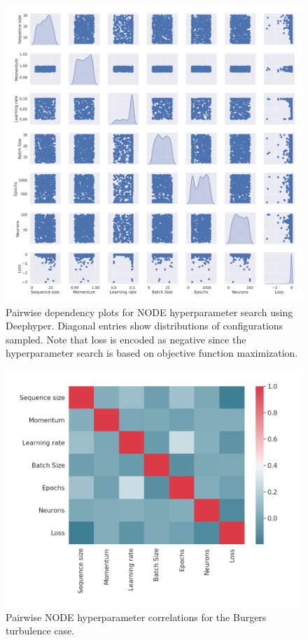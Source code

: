 \documentclass[preprint,12pt]{elsarticle}
\begin{document}
\begin{figure}
	\centering
	\includegraphics[width=\textwidth]{Figure_20.pdf}
	\caption{Pairwise dependency plots for NODE hyperparameter search using Deephyper. Diagonal entries show distributions of configurations sampled. Note that loss is encoded as negative since the hyperparameter search is based on objective function maximization.}
	\label{Figure15}
\end{figure}

\begin{figure}
	\centering
	\includegraphics[width=\textwidth]{Figure_21.pdf}
	\caption{Pairwise NODE hyperparameter correlations for the Burgers turbulence case.}
	\label{Figure16}
\end{figure}
\end{document}
